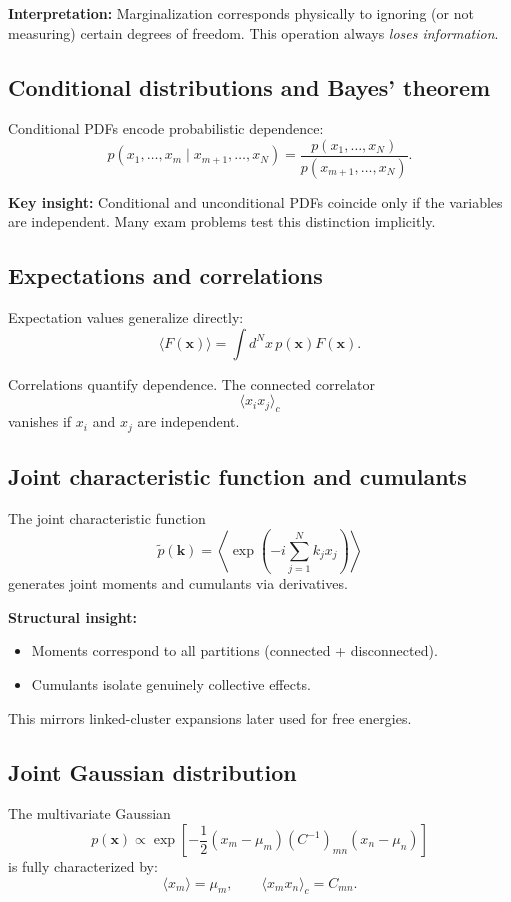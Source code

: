 \documentclass[9pt,twocoloumn]{article}
\begin{document}
\textbf{Interpretation:} Marginalization corresponds physically to ignoring (or not measuring) certain degrees of freedom. This operation always \emph{loses information}.

\subsection*{Conditional distributions and Bayes’ theorem}
Conditional PDFs encode probabilistic dependence:
\[
p(x_1,\dots,x_m \mid x_{m+1},\dots,x_N)
= \frac{p(x_1,\dots,x_N)}{p(x_{m+1},\dots,x_N)}.
\]

\textbf{Key insight:} Conditional and unconditional PDFs coincide only if the variables are independent. Many exam problems test this distinction implicitly.

\subsection*{Expectations and correlations}
Expectation values generalize directly:
\[
\langle F(\mathbf{x}) \rangle = \int d^N x \, p(\mathbf{x}) F(\mathbf{x}).
\]

Correlations quantify dependence. The connected correlator
\[
\langle x_i x_j \rangle_c
\]
vanishes if $x_i$ and $x_j$ are independent.

\subsection*{Joint characteristic function and cumulants}
The joint characteristic function
\[
\tilde p(\mathbf{k}) = \left\langle \exp\left(-i \sum_{j=1}^N k_j x_j\right) \right\rangle
\]
generates joint moments and cumulants via derivatives.

\textbf{Structural insight:}
\begin{itemize}
\item Moments correspond to all partitions (connected + disconnected).
\item Cumulants isolate genuinely collective effects.
\end{itemize}

This mirrors linked-cluster expansions later used for free energies.

\subsection*{Joint Gaussian distribution}
The multivariate Gaussian
\[
p(\mathbf{x}) \propto \exp\!\left[
-\frac{1}{2}(x_m-\mu_m)(C^{-1})_{mn}(x_n-\mu_n)
\right]
\]
is fully characterized by:
\[
\langle x_m \rangle = \mu_m,
\qquad
\langle x_m x_n \rangle_c = C_{mn}.
\]
\end{document}
